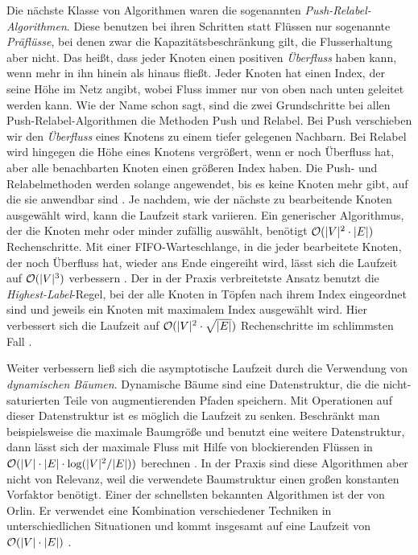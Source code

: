Die nächste Klasse von Algorithmen waren die sogenannten \emph{Push-Relabel-Algorithmen}. Diese benutzen bei ihren Schritten statt Flüssen nur sogenannte \emph{Präflüsse}, bei denen zwar die Kapazitätsbeschränkung gilt, die Flusserhaltung aber nicht. Das heißt, dass jeder Knoten einen positiven \emph{Überfluss} haben kann, wenn mehr in ihn hinein als hinaus fließt. Jeder Knoten hat einen Index, der seine Höhe im Netz angibt, wobei Fluss immer nur von oben nach unten geleitet werden kann. Wie der Name schon sagt, sind die zwei Grundschritte bei allen Push-Relabel-Algorithmen die Methoden Push und Relabel. Bei Push verschieben wir den \emph{Überfluss} eines Knotens zu einem tiefer gelegenen Nachbarn. Bei Relabel wird hingegen die Höhe eines Knotens vergrößert, wenn er noch Überfluss hat, aber alle benachbarten Knoten einen größeren Index haben. Die Push- und Relabelmethoden werden solange angewendet, bis es keine Knoten mehr gibt, auf die sie anwendbar sind \cite[S.736ff.]{clrs09}. Je nachdem, wie der nächste zu bearbeitende Knoten ausgewählt wird, kann die Laufzeit stark variieren. Ein generischer Algorithmus, der die Knoten mehr oder minder zufällig auswählt, benötigt $\mathcal{O}(|V|^2\cdot |E|)$ Rechenschritte. Mit einer FIFO-Warteschlange, in die jeder bearbeitete Knoten, der noch Überfluss hat, wieder ans Ende eingereiht wird, lässt sich die Laufzeit auf $\mathcal{O}(|V|^3)$ verbessern \cite{gt88}. Der in der Praxis verbreitetste Ansatz benutzt die \emph{Highest-Label}-Regel, bei der alle Knoten in Töpfen nach ihrem Index eingeordnet sind und jeweils ein Knoten mit maximalem Index ausgewählt wird. Hier verbessert sich die Laufzeit auf $\mathcal{O}(|V|^2\cdot \sqrt{|E|})$ Rechenschritte im schlimmsten Fall \cite{akmo97}.

Weiter verbessern ließ sich die asymptotische Laufzeit durch die Verwendung von \emph{dynamischen Bäumen}. Dynamische Bäume sind eine Datenstruktur, die die nicht-saturierten Teile von augmentierenden Pfaden speichern. Mit Operationen auf dieser Datenstruktur ist es möglich die Laufzeit zu senken. Beschränkt man beispielsweise die maximale Baumgröße und benutzt eine weitere Datenstruktur, dann lässt sich der maximale Fluss mit Hilfe von blockierenden Flüssen in $\mathcal{O}(|V|\cdot |E|\cdot \log(|V|^2/|E|))$ berechnen \cite{gt14}. In der Praxis sind diese Algorithmen aber nicht von Relevanz, weil die verwendete Baumstruktur einen großen konstanten Vorfaktor benötigt. Einer der schnellsten bekannten Algorithmen ist der von Orlin. Er verwendet eine Kombination verschiedener Techniken in unterschiedlichen Situationen und kommt insgesamt auf eine Laufzeit von $\mathcal{O}(|V|\cdot |E|)$ \cite{gt14}.
 
